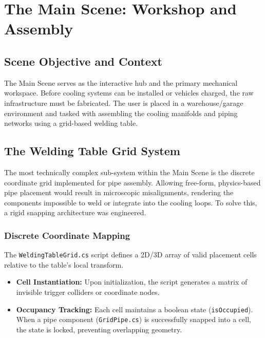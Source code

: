 \documentclass[12pt,a4paper,oneside]{report}
\begin{document}
\chapter{The Main Scene: Workshop and Assembly}

\section{Scene Objective and Context}
The Main Scene serves as the interactive hub and the primary mechanical workspace. Before cooling systems can be installed or vehicles charged, the raw infrastructure must be fabricated. The user is placed in a warehouse/garage environment and tasked with assembling the cooling manifolds and piping networks using a grid-based welding table.

\section{The Welding Table Grid System}
The most technically complex sub-system within the Main Scene is the discrete coordinate grid implemented for pipe assembly. Allowing free-form, physics-based pipe placement would result in microscopic misalignments, rendering the components impossible to weld or integrate into the cooling loops. To solve this, a rigid snapping architecture was engineered.

\subsection{Discrete Coordinate Mapping}
The \texttt{WeldingTableGrid.cs} script defines a 2D/3D array of valid placement cells relative to the table's local transform. 
\begin{itemize}
    \item \textbf{Cell Instantiation:} Upon initialization, the script generates a matrix of invisible trigger colliders or coordinate nodes.
    \item \textbf{Occupancy Tracking:} Each cell maintains a boolean state (\texttt{isOccupied}). When a pipe component (\texttt{GridPipe.cs}) is successfully snapped into a cell, the state is locked, preventing overlapping geometry.
\end{itemize}
\end{document}
